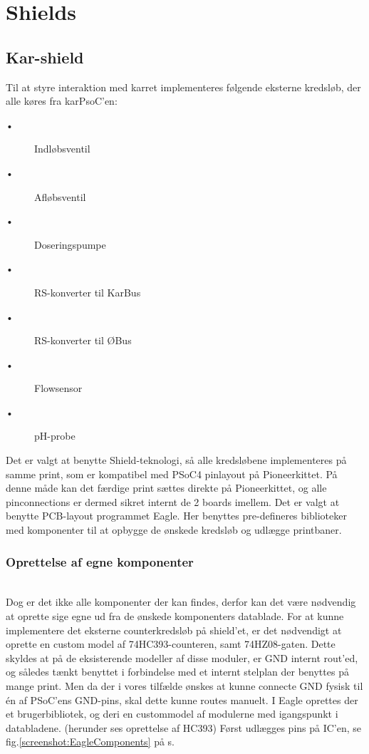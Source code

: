 
\section{Shields}
\subsection{Kar-shield}

Til at styre interaktion med karret implementeres følgende eksterne kredsløb, der alle køres fra karPsoC'en: 

\begin{description}
 \item[•] Indløbsventil
 \item[•] Afløbsventil
 \item[•] Doseringspumpe
 \item[•] RS-konverter til KarBus
 \item[•] RS-konverter til ØBus
 \item[•] Flowsensor
 \item[•] pH-probe
\end{description}
 
Det er valgt at benytte Shield-teknologi, så alle kredsløbene implementeres på samme print, som er kompatibel med PSoC4 pinlayout på Pioneerkittet. På denne måde kan det færdige print sættes direkte på Pioneerkittet, og alle pinconnections er dermed sikret internt de 2 boards imellem. 
Det er valgt at benytte PCB-layout programmet Eagle. Her benyttes pre-defineres biblioteker med komponenter til at opbygge de ønskede kredsløb og udlægge printbaner.  

\subsubsection{Oprettelse af egne komponenter} \hspace{0pt} \\
Dog er det ikke alle komponenter der kan findes, derfor kan det være nødvendig at oprette sige egne ud fra de ønskede komponenters datablade. 
For at kunne implementere det eksterne counterkredsløb på shield'et, er det nødvendigt at oprette en custom model af 74HC393-counteren, samt 74HZ08-gaten.
Dette skyldes at på de eksisterende modeller af disse moduler, er GND internt rout'ed, og således tænkt benyttet i forbindelse med et internt stelplan der benyttes på mange print. Men da der i vores tilfælde ønskes at kunne connecte GND fysisk til én af PSoC'ens GND-pins, skal dette kunne routes manuelt.
I Eagle oprettes der et brugerbibliotek, og deri en custommodel af modulerne med igangspunkt i databladene. (herunder ses oprettelse af HC393)
Først udlægges pins på IC'en, se fig.\ref{screenshot:EagleComponents} på s.\pageref{screenshot:EagleComponents}

